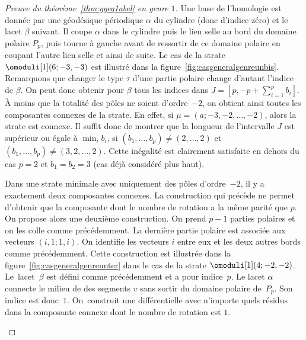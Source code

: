 \begin{proof}[Preuve du théorème~\ref{thm:ggeq1abel} en genre $1$]
Une base de l'homologie est donnée par une géodésique périodique $\alpha$ du cylindre (donc d'indice zéro) et le lacet $\beta$ suivant. Il coupe $\alpha$ dans le cylindre puis le lien selle au bord du domaine polaire $P_{p}$, puis tourne à gauche avant de ressortir de ce domaine polaire en coupant l'autre lien selle et ainsi de suite. Le cas de la strate $\omoduli[1](6;-3,-3)$ est illustré dans la figure~\ref{fig:casgeneralgenreunbis}.
Remarquons que changer le type $\tau$ d'une partie polaire change d'autant l'indice de $\beta$. On peut donc obtenir pour $\beta$ tous les indices dans $J=\left[ p,-p+\sum_{i=1}^{p} b_{i}\right]$. À moins que la totalité des pôles ne soient d'ordre~$-2$, on obtient ainsi toutes les composantes connexes de la strate. En effet, si $\mu=(a;-3,-2,\dots,-2)$, alors la strate est connexe. Il suffit donc de montrer que la longueur de l'intervalle $J$ est supérieur ou égale à $\min_{i} b_{i}$, si $(b_{1},\dots,b_{p})\neq (2,\dots,2)$ et $(b_{1},\dots,b_{p})\neq (3,2,\dots,2)$. Cette inégalité est clairement satisfaite en dehors du cas $p=2$ et $b_{1}=b_{2}=3$ (cas déjà considéré plus haut).

Dans une strate minimale avec uniquement des pôles d'ordre~$-2$, il y a exactement deux composantes connexes. La construction qui précède ne permet d'obtenir que la composante dont le nombre de rotation a la même parité que $p$.
On propose alors une deuxième construction. On prend $p-1$ parties polaires et on les colle comme précédemment. La dernière partie polaire est associée aux vecteurs $(i,1;1,i)$.
On identifie les vecteurs $i$ entre eux et les deux autres bords comme précédemment. Cette construction est illustrée dans la figure~\ref{fig:casgeneralgenreunter} dans le cas de la strate $\omoduli[1](4;-2,-2)$.
Le~lacet~$\beta$ est défini comme précédemment et a pour indice~$p$. Le lacet $\alpha$ connecte le milieu de des segments $v$ sans sortir du domaine polaire de~$P_{p}$. Son indice est donc~$1$. On~construit une différentielle avec n'importe quels résidus dans la composante connexe dont le nombre de rotation est $1$.

\begin{figure}[htb]
\center
{}
\end{figure}
\end{proof}
